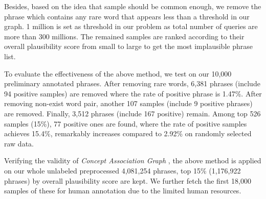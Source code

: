 

Besides, based on the idea that sample should be common enough,
we remove the phrase which contains any rare word that appears less than a threshold in our graph.
1 million is set as threshold in our problem as total number of queries are more than 300 millions.   %
The remained samples are ranked according to their overall plausibility score from small to large to get the most implausible phrase list.

To evaluate the effectiveness of the above method, we test on our 10,000 preliminary annotated phrases. %
After removing rare words, 6,381 phrases (include 94 positive samples) are removed where the rate of positive phrase is 1.47\%. After removing non-exist word pair, another 107 samples (include 9 positive phrases) are removed. Finally, 3,512 phrases (include 167 positive) remain. Among top 526 samples (15\%), 77 positive ones are found, where the rate of positive samples achieves 15.4\%, remarkably increases compared to 2.92\% on randomly selected raw data.

Verifying the validity of \textit{Concept Association Graph}%
, the above method is applied on 
our whole unlabeled preprocessed 4,081,254 phrases, %
top 15\% (1,176,922 phrases) by overall plausibility score are kept. 
We further fetch the first 18,000 samples of these for human annotation due to the 
limited human resources.

